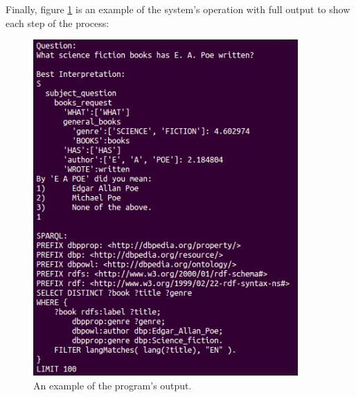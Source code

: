 \documentclass[11pt]{article}
\begin{document}
Finally, figure \ref{fig:output_example} is an example of the system's operation 
with full output to show each step of the process:
\begin{figure}[h!]
    \centering
    \includegraphics[width=0.9\textwidth,natwidth=1,natheight=1]{imgs/demo/resolve.png}
    \caption{An example of the program's output.}
    \label{fig:output_example}
\end{figure}

\clearpage
{}

\end{document}

